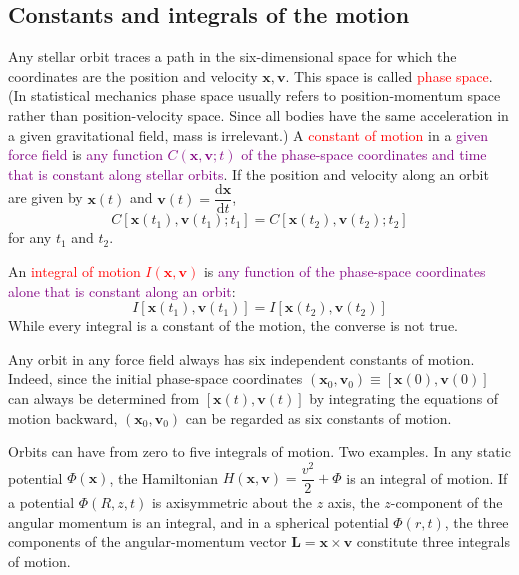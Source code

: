 \documentclass[12pt,a4paper]{article}
\renewcommand{\vec}[1]{\boldsymbol{#1}}
\newcommand{\dif}{\mathrm{d}}
\begin{document}
\subsection{Constants and integrals of the motion}
Any stellar orbit traces a path in the six-dimensional space for which the coordinates are the position and velocity $\vec{x}, \vec{v}$. This space is called \textcolor{red}{phase space}. (In statistical mechanics phase space usually refers to position-momentum space rather than position-velocity space. Since all bodies have the same acceleration in a given gravitational field, mass is irrelevant.) A \textcolor{red}{constant of motion} in a \textcolor{purple}{given force field} is \textcolor{purple}{any function $C(\vec{x}, \vec{v}; t)$ of the phase-space coordinates and time that is constant along stellar orbits}. If the position and velocity along an orbit are given by $\vec{x}(t)$ and $\vec{v}(t) = \dfrac{\dif \vec{x}}{\dif t}$,
\begin{equation}
C[\vec{x}(t_1), \vec{v}(t_1); t_1] = C[\vec{x}(t_2), \vec{v}(t_2); t_2]
\end{equation}
for any $t_1$ and $t_2$.

An \textcolor{red}{integral of motion $I(\vec{x}, \vec{v})$} is \textcolor{purple}{any function of the phase-space coordinates alone that is constant along an orbit}:
\begin{equation}
I[\vec{x}(t_1), \vec{v}(t_1)] = I[\vec{x}(t_2), \vec{v}(t_2)]
\end{equation}
While every integral is a constant of the motion, the converse is not true.

Any orbit in any force field always has six independent constants of motion. Indeed, since the initial phase-space coordinates $(\vec{x}_0, \vec{v}_0) \equiv [\vec{x}(0), \vec{v}(0)]$ can always be determined from $[\vec{x}(t), \vec{v}(t)]$ by integrating the equations of motion backward, $(\vec{x}_0, \vec{v}_0)$ can be regarded as six constants of motion.

Orbits  can have from zero to five integrals of motion. Two examples. In any static potential $\Phi(\vec{x})$, the Hamiltonian $H(\vec{x}, \vec{v}) = \dfrac{v^2}{2} +\Phi$ is an integral of motion. If a potential $\Phi(R, z, t)$ is axisymmetric about the $z$ axis, the $z$-component of the angular momentum is an integral, and in a spherical potential $\Phi(r, t)$, the three components of the angular-momentum vector $\vec{L} = \vec{x} \times \vec{v}$ constitute three integrals of motion.
\end{document}
